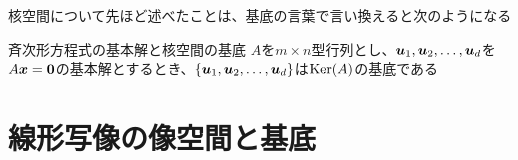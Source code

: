 \documentclass[../../../topic_linear-algebra]{subfiles}
\begin{document}
核空間について先ほど述べたことは、基底の言葉で言い換えると次のようになる

\begin{theorem}{斉次形方程式の基本解と核空間の基底}
  $A$を$m \times n$型行列とし、$\vb*{u}_1, \vb*{u}_2, \dots, \vb*{u}_d$を$A\vb*{x} = \vb*{0}$の基本解とするとき、$\{ \vb*{u}_1, \vb*{u}_2, \dots, \vb*{u}_d \}$は$\operatorname{Ker}(A)$の基底である
\end{theorem}

\sectionline
\section{線形写像の像空間と基底}

\end{document}
